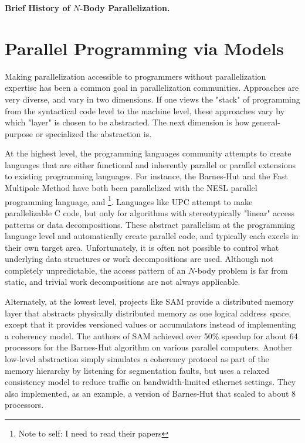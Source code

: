 \documentclass[times, leqno,twocolumn]{article}
\newcommand{\authornote}[1]{\footnote{Note to self: #1}}
\newcommand{\authorsnote}[1]{\authornote{#1}}
\begin{document}

{\bf Brief History of $N$-Body Parallelization.}



\section{Parallel Programming via Models}

Making parallelization accessible to programmers without parallelization expertise has been a common goal in parallelization communities.
Approaches are very diverse, and vary in two dimensions.
If one views the "stack" of programming from the syntactical code level to the machine level, these approaches vary by which "layer" is chosen to be abstracted.
The next dimension is how general-purpose or specialized the abstraction is.

At the highest level, the programming languages community attempts to create languages that are either functional and inherently parallel or parallel extensions to existing programming languages.
For instance, the Barnes-Hut and the Fast Multipole Method have both been parallelized with the NESL parallel programming language, and \cite{hu-implementing, more}\authorsnote{I need to read their papers}.
Languages like UPC attempt to make parallelizable C code, but only for algorithms with stereotypically "linear" access patterns or data decompositions.
These abstract parallelism at the programming language level and automatically create parallel code, and typically each excels in their own target area.
Unfortunately, it is often not possible to control what underlying data structures or work decompositions are used.
Although not completely unpredictable, the access pattern of an $N$-body problem is far from static, and trivial work decompositions are not always applicable.

Alternately, at the lowest level, projects like SAM\cite{sam} provide a distributed memory layer that abstracts physically distributed memory as one logical address space, except that it provides versioned values or accumulators instead of implementing a coherency model.
The authors of SAM achieved over 50\% speedup for about 64 processors for the Barnes-Hut algorithm on various parallel computers.
Another low-level abstraction simply simulates a coherency protocol as part of the memory hierarchy by listening for segmentation faults, but uses a relaxed consistency model to reduce traffic on bandwidth-limited ethernet settings.
They also implemented, as an example, a version of Barnes-Hut that scaled to about 8 processors\cite{relaxed}.
\end{document}
